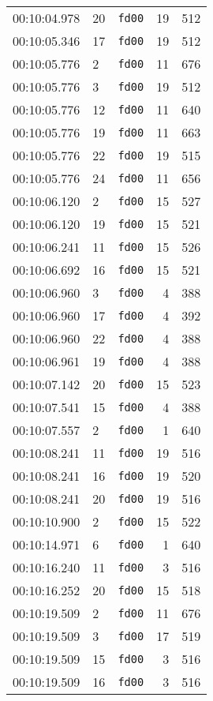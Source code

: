 \documentclass{article}
\begin{document}
\begin{longtable}{lllrr}
00:10:04.978 & 20 & \texttt{fd00} & 19 & 512 \\
00:10:05.346 & 17 & \texttt{fd00} & 19 & 512 \\
00:10:05.776 & 2 & \texttt{fd00} & 11 & 676 \\
00:10:05.776 & 3 & \texttt{fd00} & 19 & 512 \\
00:10:05.776 & 12 & \texttt{fd00} & 11 & 640 \\
00:10:05.776 & 19 & \texttt{fd00} & 11 & 663 \\
00:10:05.776 & 22 & \texttt{fd00} & 19 & 515 \\
00:10:05.776 & 24 & \texttt{fd00} & 11 & 656 \\
00:10:06.120 & 2 & \texttt{fd00} & 15 & 527 \\
00:10:06.120 & 19 & \texttt{fd00} & 15 & 521 \\
00:10:06.241 & 11 & \texttt{fd00} & 15 & 526 \\
00:10:06.692 & 16 & \texttt{fd00} & 15 & 521 \\
00:10:06.960 & 3 & \texttt{fd00} & 4 & 388 \\
00:10:06.960 & 17 & \texttt{fd00} & 4 & 392 \\
00:10:06.960 & 22 & \texttt{fd00} & 4 & 388 \\
00:10:06.961 & 19 & \texttt{fd00} & 4 & 388 \\
00:10:07.142 & 20 & \texttt{fd00} & 15 & 523 \\
00:10:07.541 & 15 & \texttt{fd00} & 4 & 388 \\
00:10:07.557 & 2 & \texttt{fd00} & 1 & 640 \\
00:10:08.241 & 11 & \texttt{fd00} & 19 & 516 \\
00:10:08.241 & 16 & \texttt{fd00} & 19 & 520 \\
00:10:08.241 & 20 & \texttt{fd00} & 19 & 516 \\
00:10:10.900 & 2 & \texttt{fd00} & 15 & 522 \\
00:10:14.971 & 6 & \texttt{fd00} & 1 & 640 \\
00:10:16.240 & 11 & \texttt{fd00} & 3 & 516 \\
00:10:16.252 & 20 & \texttt{fd00} & 15 & 518 \\
00:10:19.509 & 2 & \texttt{fd00} & 11 & 676 \\
00:10:19.509 & 3 & \texttt{fd00} & 17 & 519 \\
00:10:19.509 & 15 & \texttt{fd00} & 3 & 516 \\
00:10:19.509 & 16 & \texttt{fd00} & 3 & 516 \\

\end{longtable}
\end{document}
